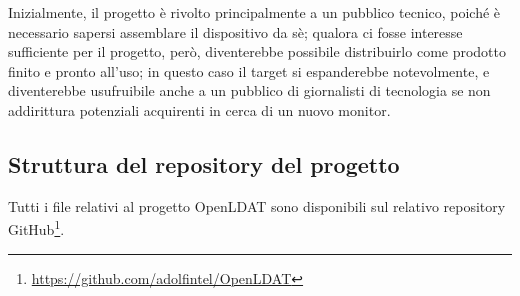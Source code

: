 Inizialmente, il progetto è rivolto principalmente a un pubblico tecnico, poiché è necessario sapersi assemblare il dispositivo da sè; qualora ci fosse interesse sufficiente per il progetto, però, diventerebbe possibile distribuirlo come prodotto finito e pronto all'uso; in questo caso il target si espanderebbe notevolmente, e diventerebbe usufruibile anche a un pubblico di giornalisti di tecnologia se non addirittura potenziali acquirenti in cerca di un nuovo monitor.

\subsection{Struttura del repository del progetto}
Tutti i file relativi al progetto OpenLDAT sono disponibili sul relativo repository GitHub\footnote{\href{https://github.com/adolfintel/OpenLDAT}{https://github.com/adolfintel/OpenLDAT}}. %

